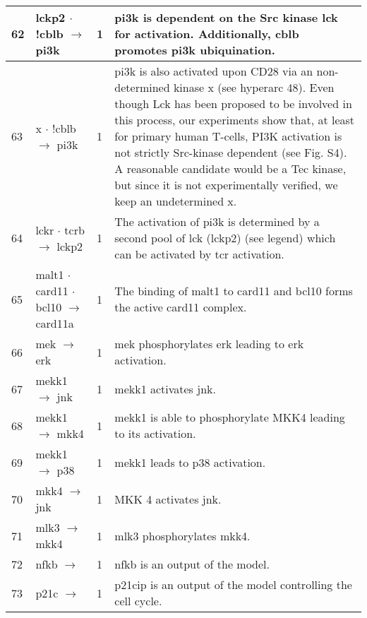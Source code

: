 \documentclass[a4paper, 12pt,epsfig, onecolumn]{article}
\newcommand{\mydot}{\hspace{-0mm} $\cdot$  \hspace{-0mm}}
\begin{document}
{\begin{center}
\begin{longtable}{|p{}|p{}|p{}|p{}|}
62& lckp2\mydot !cblb $\rightarrow$ pi3k                     &1& pi3k is dependent on the Src kinase lck for activation\cite{DeaneJA_AnnRevImmunol_04}. Additionally, cblb promotes pi3k ubiquination\cite{FangD_NatImmunol_01}. \\ \hline
63& x \mydot !cblb $\rightarrow$ pi3k                      &1&  pi3k is also activated upon CD28\cite{august:1994,ghiotto_ragueneau:1996}  via an non-determined kinase x (see hyperarc 48). Even though Lck has been proposed to be involved in this process\cite{vonWillebrandM_EJI_94,GibsonS_BiochemJ_98,holdorf:1999,huang:2002}, our experiments show that, at least for primary human T-cells, PI3K activation is not strictly Src-kinase dependent (see Fig. S4). A reasonable candidate would be a Tec kinase, but since it is not experimentally verified, we keep an undetermined x.  \\ \hline 
64& lckr\mydot tcrb $\rightarrow$ lckp2 &1& The activation        of pi3k is determined by a second pool of lck (lckp2) (see legend)\phantom{\emph{}}  which can be activated by tcr activation\cite{OkkenhaugK_NatRevImmunol_03}. \\ \hline
65& malt1 \mydot card11 \mydot  bcl10 $\rightarrow$ card11a                &1& The binding of  malt1 to card11 and bcl10 forms the active card11 complex\cite{Thome_NatRevImm_2004,Gaide_NI_2002, Uren_MolCell_2000, Lucas_JBC_2001}. \\ \hline
66& mek $\rightarrow$ erk                      &1& mek phosphorylates erk  leading to erk activation\cite{Huang_JBC_04,Krauss}. \\ \hline
67& mekk1 $\rightarrow$ jnk                  &1& mekk1 activates jnk\cite{Davis_Cell_2000}. \\ \hline
68& mekk1 $\rightarrow$ mkk4             &1& mekk1 is able  to phosphorylate MKK4 leading to its activation\cite{yan:1994}. \\ \hline
69& mekk1 $\rightarrow$ p38                            &1&   mekk1 leads to p38 activation\cite{Guan_JBC_1998}. \\ \hline
70& mkk4 $\rightarrow$ jnk                                  &1&  MKK 4 activates jnk\cite{Davis_Cell_2000,Derijard_Science_1995}. \\ \hline
71& mlk3 $\rightarrow$ mkk4                         &1& mlk3 phosphorylates mkk4\cite{Tibbles_EMBO_1996}. \\ \hline
72& nfkb $\rightarrow$                                 &1& nfkb is an output of the model. \\ \hline
73& p21c $\rightarrow$                &1& p21cip is an output of the model controlling the cell cycle. \\ \hline

\end{longtable}
\end{center}}
\end{document}
